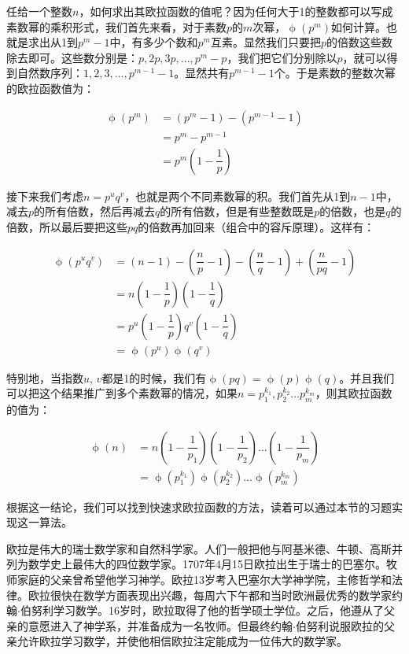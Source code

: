 \documentclass[b5paper]{ctexart}
\begin{document}
任给一个整数$n$，如何求出其欧拉函数的值呢？因为任何大于1的整数都可以写成素数幂的乘积形式，我们首先来看，对于素数$p$的$m$次幂，$\upphi(p^m)$如何计算。也就是求出从1到$p^m-1$中，有多少个数和$p^m$互素。显然我们只要把$p$的倍数这些数除去即可。这些数分别是：$p, 2p, 3p, ..., p^m - p$，我们把它们分别除以$p$，就可以得到自然数序列：$1, 2, 3, ..., p^{m-1} - 1$。显然共有$p^{m-1} - 1$个。于是素数的整数次幂的欧拉函数值为：

\begin{align*}
\upphi(p^m) &= (p^m - 1) - (p^{m-1} - 1) \\
            &= p^m - p^{m-1} \\
            &= p^m(1-\dfrac{1}{p})
\end{align*}

接下来我们考虑$n = p^uq^v$，也就是两个不同素数幂的积。我们首先从1到$n-1$中，减去$p$的所有倍数，然后再减去$q$的所有倍数，但是有些整数既是$p$的倍数，也是$q$的倍数，所以最后要把这些$pq$的倍数再加回来（组合中的容斥原理）。这样有：

\begin{align*}
\upphi(p^uq^v) &=  (n - 1) - (\dfrac{n}{p} - 1) - (\dfrac{n}{q} - 1) + (\dfrac{n}{pq} - 1) \\
          &=  n(1 - \dfrac{1}{p})(1 - \dfrac{1}{q}) \\[5pt]
          &=  p^u(1 - \dfrac{1}{p})q^v(1 - \dfrac{1}{q}) \\[5pt]
          &=  \upphi(p^u)\upphi(q^v)
\end{align*}

特别地，当指数$u$, $v$都是1的时候，我们有$\upphi(pq) = \upphi(p)\upphi(q)$。并且我们可以把这个结果推广到多个素数幂的情况，如果$n = p_1^{k_1}, p_2^{k_2}...p_m^{k_m}$，则其欧拉函数的值为：

\begin{align*}
\upphi(n) &= n(1-\dfrac{1}{p_1})(1-\dfrac{1}{p_2})...(1-\dfrac{1}{p_m}) \\[5pt]
    &= \upphi(p_1^{k_1})\upphi(p_2^{k_2})...\upphi(p_m^{k_m})
\end{align*}

根据这一结论，我们可以找到快速求欧拉函数的方法，读着可以通过本节的习题实现这一算法。

\vspace{5mm}

欧拉是伟大的瑞士数学家和自然科学家。人们一般把他与阿基米德、牛顿、高斯并列为数学史上最伟大的四位数学家。1707年4月15日欧拉出生于瑞士的巴塞尔。牧师家庭的父亲曾希望他学习神学。欧拉13岁考入巴塞尔大学神学院，主修哲学和法律。欧拉很快在数学方面表现出兴趣，每周六下午都和当时欧洲最优秀的数学家约翰$\cdot$伯努利学习数学。16岁时，欧拉取得了他的哲学硕士学位。之后，他遵从了父亲的意愿进入了神学系，并准备成为一名牧师。但最终约翰$\cdot$伯努利说服欧拉的父亲允许欧拉学习数学，并使他相信欧拉注定能成为一位伟大的数学家。
\end{document}

